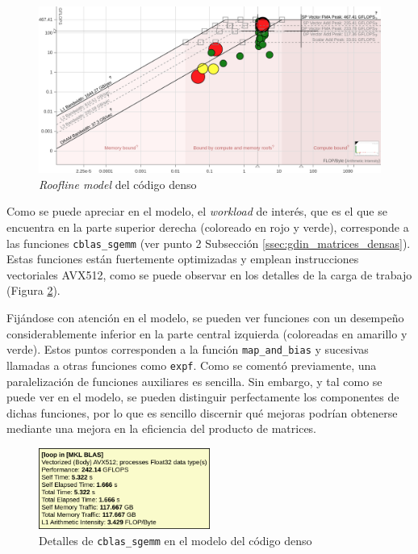 \begin{figure}[h!]
    \centering
    \includegraphics[width=\textwidth]{img/rooflines/roofline_dense.png}
    \caption{\textit{Roofline model} del código denso}
    \label{fig:roofline_dense}
\end{figure}

Como se puede apreciar en el modelo, el \textit{workload} de interés, que es el que se encuentra en la parte superior derecha (coloreado en rojo y verde), corresponde a las funciones \texttt{cblas\_sgemm} (ver punto 2 Subsección \ref{ssec:gdin_matrices_densas}). Estas funciones están fuertemente optimizadas y emplean instrucciones vectoriales AVX512, como se puede observar en los detalles de la carga de trabajo (Figura \ref{fig:roofline_dense_details}).

Fijándose con atención en el modelo, se pueden ver funciones con un desempeño considerablemente inferior en la parte central izquierda (coloreadas en amarillo y verde). Estos puntos corresponden a la función \texttt{map\_and\_bias} y sucesivas llamadas a otras funciones como \texttt{expf}. Como se comentó previamente, una paralelización de funciones auxiliares es sencilla. Sin embargo, y tal como se puede ver en el modelo, se pueden distinguir perfectamente los componentes de dichas funciones, por lo que es sencillo discernir qué mejoras podrían obtenerse mediante una mejora en la eficiencia del producto de matrices.

\begin{figure}[h!]
    \centering
    \includegraphics[width=0.5\textwidth]{img/rooflines/roofline_dense_details.png}
    \caption{Detalles de \texttt{cblas\_sgemm} en el modelo del código denso}
    \label{fig:roofline_dense_details}
\end{figure}

